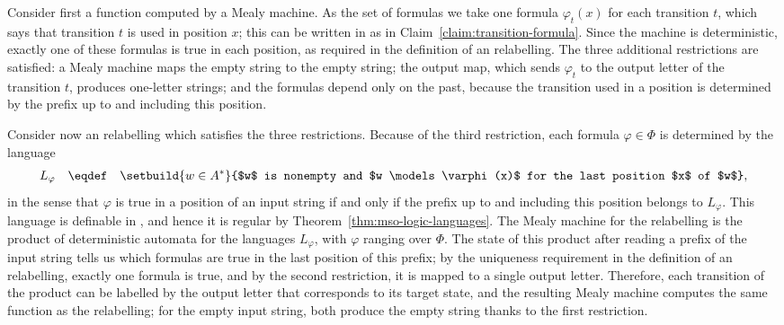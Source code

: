  {
    Consider first a function computed by a Mealy machine. As the set of formulas we take one formula $\varphi_t(x)$ for each transition $t$, which says that transition $t$ is used in position $x$; this can be written in \mso as in Claim~\ref{claim:transition-formula}. Since the machine is deterministic, exactly one of these formulas is true in each position, as required in the definition of an \mso relabelling. The three additional restrictions are satisfied: a Mealy machine maps the empty string to the empty string; the output map, which sends $\varphi_t$ to the output letter of the transition $t$, produces one-letter strings; and the formulas depend only on the past, because the transition used in a position is determined by the prefix up to and including this position.

    Consider now an \mso relabelling which satisfies the three restrictions. Because of the third restriction, each formula $\varphi \in \Phi$ is determined by the language
    \begin{align*}
    L_\varphi \quad \eqdef \quad \setbuild{w \in A^*}{$w$ is nonempty and $w \models \varphi(x)$ for the last position $x$ of $w$},
    \end{align*}
    in the sense that $\varphi$ is true in a position of an input string if and only if the prefix up to and including this position belongs to $L_\varphi$. This language is definable in \mso, and hence it is regular by Theorem~\ref{thm:mso-logic-languages}. The Mealy machine for the relabelling is the product of deterministic automata for the languages $L_\varphi$, with $\varphi$ ranging over $\Phi$. The state of this product after reading a prefix of the input string tells us which formulas are true in the last position of this prefix; by the uniqueness requirement in the definition of an \mso relabelling, exactly one formula is true, and by the second restriction, it is mapped to a single output letter. Therefore, each transition of the product can be labelled by the output letter that corresponds to its target state, and the resulting Mealy machine computes the same function as the relabelling; for the empty input string, both produce the empty string thanks to the first restriction.
}
